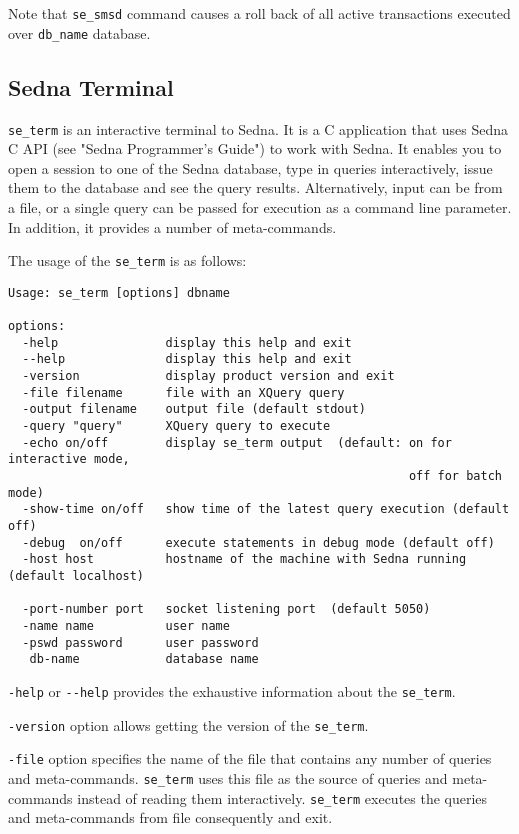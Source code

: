 \documentclass[a4paper,12pt]{article}
\begin{document}
Note that \verb!se_smsd! command causes a roll back of all active transactions executed over \verb!db_name! database.


\subsection{Sedna Terminal}
\label{terminal}
\verb!se_term! is an interactive terminal to Sedna. It is a C application that uses Sedna C API (see "Sedna Programmer's Guide") to work with Sedna. It enables you to open a session to one of the Sedna database, type in queries interactively, issue them to the database and see the query results. Alternatively, input can be from a file, or a single query can be passed for execution as a command line parameter. In addition, it provides a number of meta-commands. 

The usage of the \verb!se_term! is as follows:

\begin{verbatim}
Usage: se_term [options] dbname

options:
  -help			      display this help and exit
  --help		      display this help and exit
  -version		      display product version and exit
  -file filename	  file with an XQuery query			  
  -output filename	  output file (default stdout)
  -query "query"	  XQuery query to execute		
  -echo on/off		  display se_term output  (default: on for interactive mode,
                                                        off for batch mode)
  -show-time on/off	  show time of the latest query execution (default off)
  -debug  on/off      execute statements in debug mode (default off)
  -host host		  hostname of the machine with Sedna running (default localhost)
		
  -port-number port	  socket listening port  (default 5050)
  -name name		  user name 
  -pswd password	  user password 
   db-name		      database name
\end{verbatim}

\verb!-help! or \verb!--help! provides the exhaustive information about the \verb!se_term!.

\verb!-version! option allows getting the version of the \verb!se_term!.

\verb!-file! option specifies the name of the file that contains any number of queries and meta-commands. \verb!se_term! uses this file as the source of queries and meta-commands instead of reading them interactively. \verb!se_term! executes the queries and meta-commands from file consequently and exit.
\end{document}
